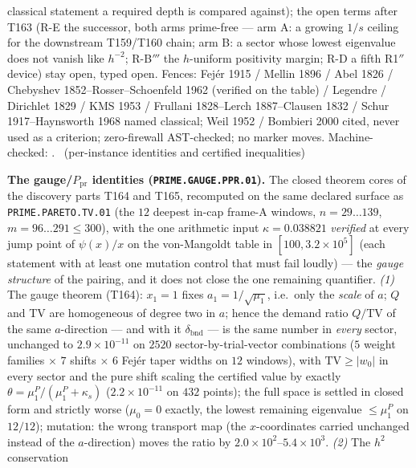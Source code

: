 classical statement a required depth is compared against); the open
terms after T163 (R-E the successor, both arms prime-free --- arm A: a
growing $1/s$ ceiling for the downstream T159/T160 chain; arm B: a
sector whose lowest eigenvalue does not vanish like $h^{-2}$; R-B$'''$
the $h$-uniform positivity margin; R-D a fifth R1$''$ device) stay
open, typed open. Fences: Fej\'er 1915 / Mellin 1896 / Abel 1826 /
Chebyshev 1852--Rosser--Schoenfeld 1962 (verified on the table) /
Legendre / Dirichlet 1829 / KMS 1953 / Frullani 1828--Lerch
1887--Clausen 1832 / Schur 1917--Haynsworth 1968 named classical; Weil
1952 / Bombieri 2000 cited, never used as a criterion; zero-firewall
AST-checked; no marker moves.
Machine-checked: .
\mE\ (per-instance identities and certified inequalities)


\par\smallskip\noindent\textbf{The gauge/$P_{\mathrm{pr}}$ identities
(\texttt{PRIME.GAUGE.PPR.01}).}
The closed theorem cores of the discovery parts T164 and T165,
recomputed on the same declared surface as
\texttt{PRIME.PARETO.TV.01} (the $12$ deepest in-cap frame-A windows,
$n=29\ldots139$, $m=96\ldots291\le300$), with the one arithmetic input
$\kappa=0.038821$ \emph{verified} at every jump point of $\psi(x)/x$ on
the von-Mangoldt table in $[100,3.2\times10^{5}]$ (each statement with
at least one mutation control that must fail loudly) --- the \emph{gauge
structure} of the pairing, and it does not close the one remaining
quantifier. \emph{(1)} The gauge theorem (T164): $x_1=1$ fixes
$a_1=1/\sqrt{\mu_1}$, i.e.\ only the \emph{scale} of $a$; $Q$ and TV are
homogeneous of degree two in $a$; hence the demand ratio
$Q/\mathrm{TV}$ of the same $a$-direction --- and with it
$\delta_{\mathrm{bnd}}$ --- is the same number in \emph{every} sector,
unchanged to $2.9\times10^{-11}$ on $2520$ sector-by-trial-vector
combinations ($5$ weight families $\times$ $7$ shifts $\times$ $6$
Fej\'er taper widths on $12$ windows), with $\mathrm{TV}\ge|w_0|$ in
every sector and the pure shift scaling the certified value by exactly
$\theta=\mu^P_1/(\mu^P_1+\kappa_s)$ ($2.2\times10^{-11}$ on $432$
points); the full space is settled in closed form and strictly worse
($\mu_0=0$ exactly, the lowest remaining eigenvalue $\le\mu^P_1$ on
$12/12$); mutation: the wrong transport map (the $x$-coordinates
carried unchanged instead of the $a$-direction) moves the ratio by
$2.0\times10^{2}$--$5.4\times10^{3}$. \emph{(2)} The $h^2$ conservation

